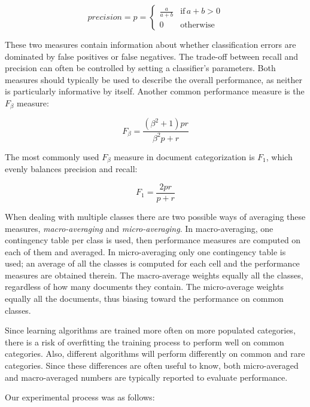 \documentclass[a4paper,twocolumn]{article}
\begin{document}
\begin{displaymath}
precision = p = \left\{ \begin{array}{ll}
\frac{a}{a+b} & \textrm{if} \, a+b>0 \\
0                  & \textrm{otherwise}
\end{array} \right.
\end{displaymath}

These two measures contain information about whether classification
errors are dominated by false positives or false negatives.  The
trade-off between recall and precision can often be controlled by
setting a classifier's parameters. Both measures should typically be
used to describe the overall performance, as neither is particularly
informative by itself. Another common performance measure is the
$F_\beta$ measure:

\begin{displaymath}
F_\beta = \frac{(\beta^2 + 1)pr}{\beta^2 p + r}
\end{displaymath}

The most commonly used $F_\beta$ measure in document categorization is
$F_1$, which evenly balances precision and recall:

\begin{displaymath}
F_1 = \frac{2pr}{p + r}
\end{displaymath}

When dealing with multiple classes there are two possible ways of
averaging these measures, \emph{macro-averaging} and
\emph{micro-averaging}. In macro-averaging, one contingency table per
class is used, then performance measures are computed on each of them
and averaged. In micro-averaging only one contingency table is used;
an average of all the classes is computed for each cell and the
performance measures are obtained therein. The macro-average weights
equally all the classes, regardless of how many documents they
contain. The micro-average weights equally all the documents, thus
biasing toward the performance on common classes.

Since learning algorithms are trained more often on more populated
categories, there is a risk of overfitting the training process to
perform well on common categories.  Also, different algorithms will
perform differently on common and rare categories.  Since these
differences are often useful to know, both micro-averaged and
macro-averaged numbers are typically reported to evaluate performance.

Our experimental process was as follows:
\end{document}
